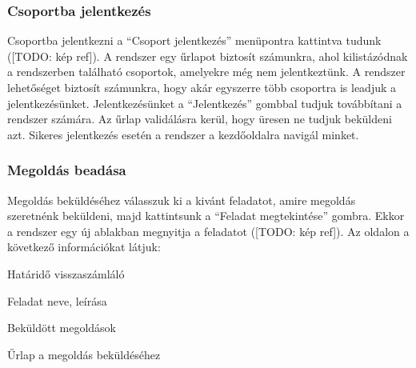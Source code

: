 \subsubsection{Csoportba jelentkezés}
\label{step:student-course-reg}
Csoportba jelentkezni a ``Csoport jelentkezés'' menüpontra kattintva tudunk ([TODO: kép ref]). A rendszer egy űrlapot biztosít számunkra, ahol kilistázódnak a rendszerben található csoportok, amelyekre még nem jelentkeztünk. A rendszer lehetőséget biztosít számunkra, hogy akár egyszerre több csoportra is leadjuk a jelentkezésünket. Jelentkezésünket a ``Jelentkezés'' gombbal tudjuk továbbítani a rendszer számára. Az űrlap validálásra kerül, hogy üresen ne tudjuk beküldeni azt. Sikeres jelentkezés esetén a rendszer a kezdőoldalra navigál minket.
\subsubsection{Megoldás beadása}
\label{step:student-solution}
Megoldás beküldéséhez válasszuk ki a kivánt feladatot, amire megoldás szeretnénk beküldeni, majd kattintsunk a ``Feladat megtekintése'' gombra. Ekkor a rendszer egy új ablakban megnyitja a feladatot ([TODO: kép ref]). Az oldalon a következő információkat látjuk:
\begin{compactitem}
    \item Határidő visszaszámláló
    \item Feladat neve, leírása
    \item Beküldött megoldások
    \item Űrlap a megoldás beküldéséhez
\end{compactitem}
